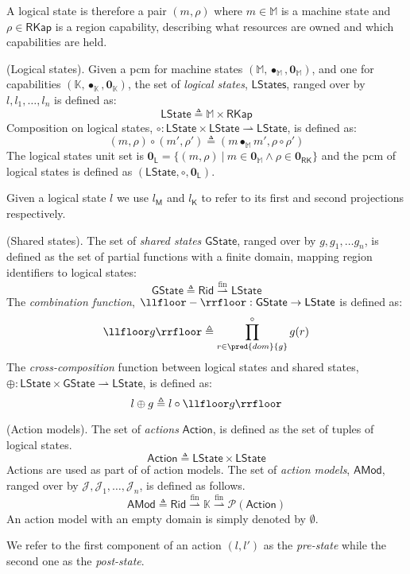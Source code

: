 A logical state is therefore a pair $(m, \rho)$ where $m \in \mathbb{M}$ is a machine state and $\rho \in \mathsf{RKap}$ is a region capability, describing what resources are owned and which capabilities are held.
\begin{defn}
	(Logical states).
	Given a pcm for machine states $(\mathbb{M}, \bullet_\mathbb{M}, \mathbf{0}_\mathbb{M})$, and one for capabilities $(\mathbb{K}, \bullet_\mathbb{K}, \mathbf{0}_\mathbb{K})$, the set of \emph{logical states}, $\mathsf{LStates}$, ranged over by $l, l_1, \ldots, l_n$ is defined as:
	\[
		\mathsf{LState} \triangleq \mathbb{M} \times \mathsf{RKap}
	\]
	Composition on logical states, $\circ : \mathsf{LState} \times \mathsf{LState} \rightharpoonup \mathsf{LState}$, is defined as:
	\[
		(m, \rho) \circ (m', \rho') \triangleq (m \bullet_\mathbb{M} m', \rho \circ \rho')
	\]
	The logical states unit set is $\mathbf{0}_\mathsf{L} = \{ (m, \rho)\ |\ m \in \mathbf{0}_\mathbb{M} \land \rho \in \mathbf{0}_\mathsf{RK} \}$ and the pcm of logical states is defined as $(\mathsf{LState}, \circ, \mathbf{0}_\mathsf{L})$.
\end{defn}
Given a logical state $l$ we use $l_\mathsf{M}$ and $l_\mathsf{K}$ to refer to its first and second projections respectively.

\begin{defn}
	(Shared states).
	The set of \emph{shared states} $\mathsf{GState}$, ranged over by $g, g_1, \ldots g_n$, is defined as the set of partial functions with a finite domain, mapping region identifiers to logical states:
	\[
		\mathsf{GState} \triangleq \mathsf{Rid} \overset{\text{fin}}{\rightharpoonup} \mathsf{LState}
	\]
	The \emph{combination function}, $\llfloor - \rrfloor : \mathsf{GState} \rightarrow \mathsf{LState}$ is defined as:
	\[
		\llfloor g \rrfloor \triangleq \prod^{\circ}_{r \in \pred{dom}{g}} g(r)
	\]
	The \textit{cross-composition} function between logical states and shared states, $\oplus : \mathsf{LState} \times \mathsf{GState} \rightharpoonup \mathsf{LState}$, is defined as:
	\[
		l \oplus g \triangleq l \circ \llfloor g \rrfloor
	\]
\end{defn}

\begin{defn}
	(Action models).
	The set of \emph{actions} $\mathsf{Action}$, is defined as the set of tuples of logical states.
	\[
		\mathsf{Action} \triangleq \mathsf{LState} \times \mathsf{LState}
	\]
	Actions are used as part of of action models. The set of \emph{action models}, $\mathsf{AMod}$, ranged over by $\mathcal{J}, \mathcal{J}_1, \ldots, \mathcal{J}_n$, is defined as follows.
	\[
		\mathsf{AMod} \triangleq \mathsf{Rid} \overset{\text{fin}}{\rightharpoonup} \mathbb{K} \overset{\text{fin}}{\rightharpoonup} \mathcal{P}(\mathsf{Action})
	\]
	An action model with an empty domain is simply denoted by $\emptyset$.
\end{defn}
We refer to the first component of an action $(l, l')$ as the \emph{pre-state} while the second one as the \emph{post-state}. 

